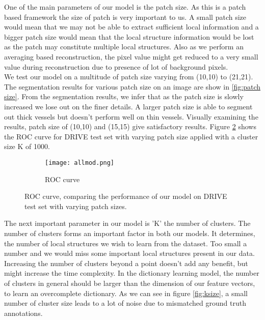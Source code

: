 One of the main parameters of our model is the patch size. As this is a patch based framework the size of patch is very important to us. A small patch size would mean that we may not be able to extract sufficient local information and a bigger patch size would mean that the local structure information would be lost as the patch may constitute multiple local structures. Also as we perform an averaging based reconstruction, the pixel value might get reduced to a very small value during reconstruction due to presence of lot of background pixels.\\ 

We test our model on a multitude of patch size varying from (10,10) to (21,21). The segmentation results for various patch size on an image are show in \ref{fig:patch size}. From the segmentation results, we infer that as the patch size is slowly increased we lose out on the finer details. A larger patch size is able to segment out thick vessels but doesn't perform well on thin vessels. Visually examining the results, patch size of (10,10) and (15,15) give satisfactory results. Figure \ref{fig:patchcompare} shows the ROC curve for DRIVE test set with varying patch size applied with a cluster size K of 1000.\\ 




\begin{figure}
	\centering
	\begin{subfigure}[b]{0.45\textwidth}
		\texttt{[image: allmod.png]}
		\caption{ROC curve}
		\label{fig:patchcom}
	\end{subfigure}
	\caption[ROC curve with varying patch size]{ROC curve, comparing the performance of our model on DRIVE test set with varying patch sizes.}
	\label{fig:patchcompare}
\end{figure}

The next important parameter in our model is 'K' the number of clusters. The number of clusters forms an important factor in both our models. It determines, the number of local structures we wish to learn from the dataset. Too small a number and we would miss some important local structures present in our data. Increasing the number of clusters beyond a point doesn't add any benefit, but might increase the time complexity. In the dictionary learning model, the number of clusters in general should be larger than the dimension of our feature vectors, to learn an overcomplete dictionary. As we can see in figure \ref{fig:ksize}, a small number of cluster size leads to a lot of noise due to mismatched ground truth annotations.

